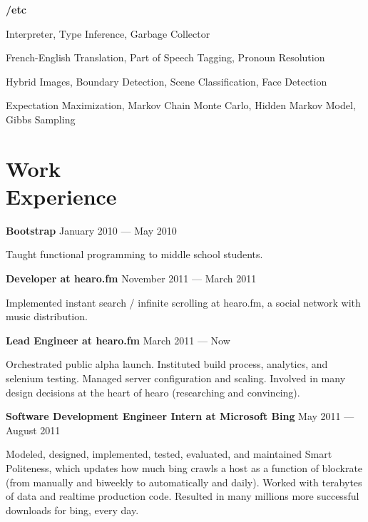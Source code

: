\documentclass[margin,line]{resume}
\begin{document}
\begin{resume}
      \textbf{/etc}  \par 
      {\addtolength{\leftskip}{2 mm}
   \begin{list2}
   \item Interpreter, Type Inference, Garbage Collector
   \item French-English Translation, Part of Speech Tagging, Pronoun Resolution
   \item Hybrid Images, Boundary Detection, Scene Classification, Face Detection
     \item Expectation Maximization, Markov Chain Monte Carlo, Hidden Markov Model, Gibbs Sampling
       \end{list2}
      \par}      

    \section{\mysidestyle{} Work\\Experience}

    \textbf{Bootstrap}  \hfill January 2010 — May 2010  \par\vspace{-4.0mm}   
     {\addtolength{\leftskip}{2 mm}
  Taught functional programming to middle school students.
      \par}
    
    \textbf{Developer at hearo.fm}  \hfill November 2011 — March 2011   \par\vspace{-4.0mm} 
     {\addtolength{\leftskip}{2 mm}
       Implemented instant search / infinite scrolling at hearo.fm, a social network with music distribution.
       \par}
       
    \textbf{Lead Engineer at hearo.fm} \hfill March 2011 — Now      \par\vspace{-4.0mm}
          {\addtolength{\leftskip}{2 mm}
          Orchestrated public alpha launch. Instituted build process, analytics, and selenium testing. Managed server configuration and scaling. Involved in many design decisions at the heart of hearo (researching and convincing).
      \par}

  \textbf{Software Development Engineer Intern at Microsoft Bing}  \hfill May 2011 — August 2011  \par\vspace{-4.0mm}
          {\addtolength{\leftskip}{2 mm}
           Modeled, designed, implemented, tested, evaluated, and maintained Smart Politeness, which updates how much bing crawls a host as a function of blockrate (from manually and biweekly to automatically and daily). Worked with terabytes of data and realtime production code. Resulted in many millions more successful downloads for bing, every day. 
 \par}


\end{resume}
\end{document}
